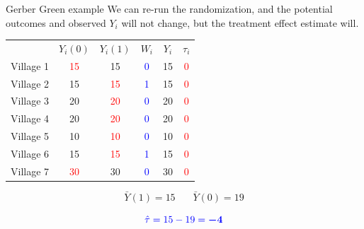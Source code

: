 \documentclass[xcolor={dvipsnames},handout]{beamer}
\begin{document}
\begin{frame}{Gerber Green example}
We can re-run the randomization, and the potential outcomes and observed $Y_i$ will not change, but the treatment effect estimate will.

\begin{table}[]
\begin{tabular}{lccccc}
& $Y_i(0)$ & $Y_i(1)$ & $W_i$ & $Y_i$ & $\tau_i$ \\
Village 1 & \textcolor{red}{15} & 15 & \textcolor{blue}{0} & 15 & \textcolor{red}{0} \\
Village 2 & 15 & \textcolor{red}{15} & \textcolor{blue}{1} & 15 &\textcolor{red}{0} \\
Village 3 & 20 & \textcolor{red}{20} & \textcolor{blue}{0} & 20 &\textcolor{red}{0} \\
Village 4 & 20 & \textcolor{red}{20} & \textcolor{blue}{0} & 20 &\textcolor{red}{0} \\
Village 5 & 10 & \textcolor{red}{10} & \textcolor{blue}{0} & 10 &\textcolor{red}{0} \\
Village 6 & 15 & \textcolor{red}{15} & \textcolor{blue}{1} & 15 &\textcolor{red}{0} \\
Village 7 & \textcolor{red}{30} & 30 & \textcolor{blue}{0} & 30 &\textcolor{red}{0}
\end{tabular}
\end{table}

$$
\bar{Y}(1) = 15 \ \ \ \ \ \ \ \ \bar{Y}(0) = 19
$$

$$
\color{blue}{\hat{\tau} = 15-19 = \bm{-4}}
$$

\end{frame}


\end{document}
